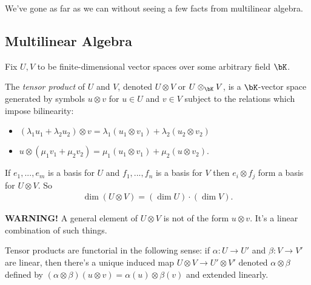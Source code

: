 We've gone as far as we can without seeing a few facts from multilinear algebra.

\subsection{Multilinear Algebra}

Fix $U, V$ to be finite-dimensional vector spaces over some arbitrary field $\bK$.
\begin{defn}\label{defn:tensor-product}
	The \emph{tensor product} of $U$ and $V$, denoted $U\otimes V$ or $U\otimes_\bK V$, is a $\bK$-vector space generated by symbols $u\otimes v$ for $u \in U$ and $v \in V$ subject to the relations which impose bilinearity:
	\begin{itemize}
		\item $(\lambda_1u_1+\lambda_2u_2) \otimes v = \lambda_1(u_1\otimes v_1) + \lambda_2(u_2\otimes v_2)$
		\item $u\otimes (\mu_1v_1 + \mu_2v_2) = \mu_1(u_1\otimes v_1) + \mu_2(u\otimes v_2)$.
	\end{itemize}
\end{defn}
\begin{lem}\label{lem:lec2.32}
	If $e_1,...,e_m$ is a basis for $U$ and $f_1,...,f_n$ is a basis for $V$ then $e_i\otimes f_j$ form a basis for $U\otimes V$. So
	\begin{align*}
		\dim(U\otimes V) = (\dim U)\cdot (\dim V).
	\end{align*}
\end{lem}

\noindent\textbf{WARNING!} A general element of $U\otimes V$ is not of the form $u\otimes v$. It's a linear combination of such things.

\begin{lem}\label{lem:lec2.32}
	Tensor products are functorial in the following sense: if $\alpha:U\to U'$ and $\beta:V\to V'$ are linear, then there's a unique induced map $U\otimes V\to U'\otimes V'$ denoted $\alpha\otimes \beta$ defined by $(\alpha\otimes\beta)(u\otimes v) = \alpha(u)\otimes \beta(v)$ and extended linearly.
\end{lem}

